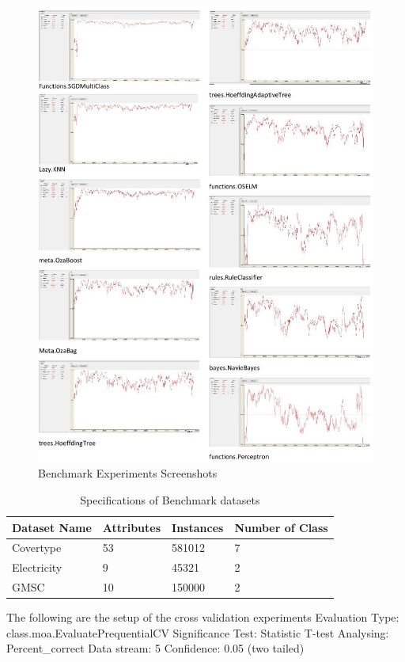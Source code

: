 \documentclass[a4paper, 14pt]{extarticle}
\begin{document}
\begin{figure}
    \centering
    \includegraphics[width=\textwidth]{OSELM-benchmark.jpg}
    \caption{Benchmark Experiments Screenshots}
    \label{fig:benchmark screenshots}
\end{figure}

\begin{table}[H]
\caption{Specifications of Benchmark datasets}
\label{tab:OSELMCV}
\centering
\begin{tabular}{ |p{2.8cm}||p{2.5cm}|p{2.5cm}|p{2.5cm}|  }
 \hline
 Dataset Name& Attributes & Instances &   Number of Class\\
 \hline
 Covertype   &  53   & 581012 &  7\\
  \hline
 Electricity &   9  &  45321  & 2\\
  \hline
 GMSC & 10 & 150000 & 2\\
  \hline
\end{tabular}
\end{table}
\par The following are the setup of the cross validation experiments
\newline
\newline Evaluation Type: class.moa.EvaluatePrequentialCV  \newline
Significance Test: Statistic T-test     \newline
Analysing:  Percent\_correct \newline
Data stream:   5 \newline
Confidence: 0.05 (two tailed) \newline
\end{document}
